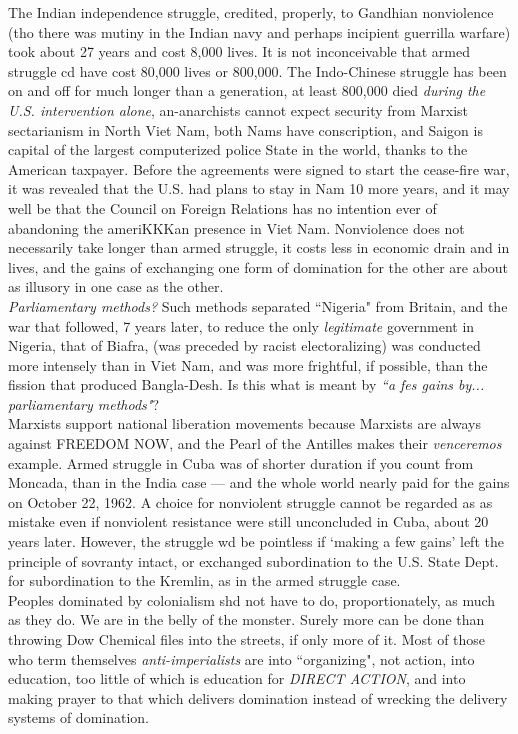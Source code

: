 The Indian independence struggle, credited, properly, to Gandhian nonviolence (tho there was mutiny in the Indian navy and perhaps incipient guerrilla warfare) took about 27 years and cost 8,000 lives. It is not inconceivable that armed struggle cd have cost 80,000 lives or 800,000. The Indo-Chinese struggle has been on and off for much longer than a generation, at least 800,000 died \emph{during the U.S. intervention alone}, an-anarchists cannot expect security from Marxist sectarianism in North Viet Nam, both Nams have conscription, and Saigon is capital of the largest computerized police State in the world, thanks to the American taxpayer. Before the agreements were signed to start the cease-fire war, it was revealed that the U.S. had plans to stay in Nam 10 more years, and it may well be that the Council on Foreign Relations has no intention ever of abandoning the ameriKKKan presence in Viet Nam. Nonviolence does not necessarily take longer than armed struggle, it costs less in economic drain and in lives, and the gains of exchanging one form of domination for the other are about as illusory in one case as the other.\\
\emph{Parliamentary methods?} Such methods separated ``Nigeria" from Britain, and the war that followed, 7 years later, to reduce the only \emph{legitimate} government in Nigeria, that of Biafra, (was preceded by racist electoralizing) was conducted more intensely than in Viet Nam, and was more frightful, if possible, than the fission that produced Bangla-Desh. Is this what is meant by \emph{``a fes gains by... parliamentary methods"}?\\
Marxists support national liberation movements because Marxists are always against FREEDOM NOW, and the Pearl of the Antilles makes their \emph{venceremos} example. Armed struggle in Cuba was of shorter duration if you count from Moncada, than in the India case --- and the whole world nearly paid for the gains on October 22, 1962. A choice for nonviolent struggle cannot be regarded as as mistake even if nonviolent resistance were still unconcluded in Cuba, about 20 years later. However, the struggle wd be pointless if `making a few gains' left the principle of sovranty intact, or exchanged subordination to the U.S. State Dept. for subordination to the Kremlin, as in the armed struggle case.\\
Peoples dominated by colonialism shd not have to do, proportionately, as much as they do. We are in the belly of the monster. Surely more can be done than throwing Dow Chemical files into the streets, if only more of it. Most of those who term themselves \emph{anti-imperialists} are into ``organizing", not action, into education, too little of which is education for \emph{DIRECT ACTION}, and into making prayer to that which delivers domination instead of wrecking the delivery systems of domination.\\
